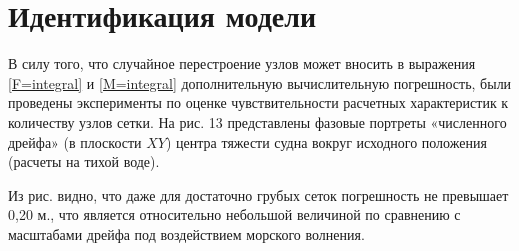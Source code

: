 \section{Идентификация модели}

В силу того, что случайное перестроение узлов может вносить в выражения \eqref{F=integral} и \eqref{M=integral} дополнительную вычислительную погрешность, были проведены эксперименты по оценке чувствительности расчетных характеристик к количеству узлов сетки. На рис. 13 представлены фазовые портреты «численного дрейфа» (в плоскости $XY$) центра тяжести судна вокруг исходного положения (расчеты на тихой воде).

Из рис. видно, что даже для достаточно грубых сеток погрешность не превышает 0,20 м., что является относительно небольшой величиной по сравнению с масштабами дрейфа под воздействием морского волнения.
